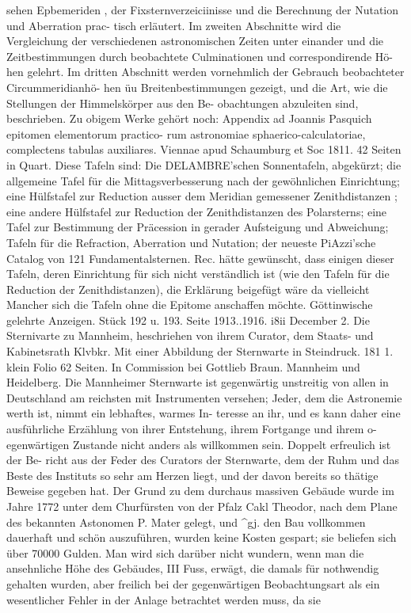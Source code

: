 \documentclass[12pt,a4paper]{article}
\begin{document}
sehen  Epbemeriden ,  der  Fixsternverzeiciinisse  und  die  Berechnung  der  Nutation  und  Aberration  prac- tisch  erläutert.  Im  zweiten  Abschnitte  wird  die  Vergleichung  der  verschiedenen  astronomischen  Zeiten unter  einander  und  die  Zeitbestimmungen  durch  beobachtete  Culminationen  und  correspondirende  Hö- hen gelehrt.  Im  dritten  Abschnitt  werden  vornehmlich  der  Gebrauch  beobachteter  Circummeridianhö- hen  üu  Breitenbestimmungen  gezeigt,  und  die  Art,  wie  die  Stellungen  der  Himmelskörper  aus  den  Be- obachtungen abzuleiten  sind,  beschrieben. Zu  obigem  Werke  gehört  noch:  Appendix  ad  Joannis  Pasquich  epitomen  elementorum  practico- rum  astronomiae  sphaerico-calculatoriae,  complectens  tabulas  auxiliares.  Viennae  apud  Schaumburg  et Soc  1811.  42  Seiten  in  Quart.  Diese  Tafeln  sind:  Die  DELAMBRE'schen  Sonnentafeln,  abgekürzt;  die allgemeine  Tafel  für  die  Mittagsverbesserung  nach  der  gewöhnlichen  Einrichtung;  eine  Hülfstafel  zur Reduction  ausser  dem  Meridian  gemessener  Zenithdistanzen ;  eine  andere  Hülfstafel  zur  Reduction  der Zenithdistanzen  des  Polarsterns;  eine  Tafel  zur  Bestimmung  der  Präcession  in  gerader  Aufsteigung  und Abweichung;  Tafeln  für  die  Refraction,  Aberration  und  Nutation;  der  neueste  PiAzzi'sche  Catalog  von 121  Fundamentalsternen.  Rec.  hätte  gewünscht,  dass  einigen  dieser  Tafeln,  deren  Einrichtung  für  sich nicht  verständlich  ist  (wie  den  Tafeln  für  die  Reduction  der  Zenithdistanzen),  die  Erklärung  beigefügt wäre    da  vielleicht  Mancher  sich  die  Tafeln  ohne  die  Epitome  anschaffen  möchte. Göttinwische  gelehrte  Anzeigen.  Stück  192  u.  193.  Seite  1913..1916.  i8ii  December  2. Die  Sternivarte  zu  Mannheim,  heschriehen  von  ihrem  Curator,  dem  Staats-  und  Kabinetsrath  Klvbkr. Mit  einer  Abbildung  der  Sternwarte  in  Steindruck.  181 1.  klein  Folio  62  Seiten.  In  Commission  bei Gottlieb  Braun.     Mannheim  und  Heidelberg. Die  Mannheimer  Sternwarte  ist  gegenwärtig  unstreitig  von  allen  in  Deutschland  am  reichsten mit  Instrumenten  versehen;  Jeder,  dem  die  Astronemie  werth  ist,  nimmt  ein  lebhaftes,  warmes  In- teresse an  ihr,  und  es  kann  daher  eine  ausführliche  Erzählung  von  ihrer  Entstehung,  ihrem  Fortgange und  ihrem  o-egenwärtigen  Zustande  nicht  anders  als  willkommen  sein.  Doppelt  erfreulich  ist  der  Be- richt aus  der  Feder  des  Curators  der  Sternwarte,  dem  der  Ruhm  und  das  Beste  des  Instituts  so  sehr am  Herzen  liegt,  und  der  davon  bereits  so  thätige  Beweise  gegeben  hat. Der  Grund  zu  dem  durchaus  massiven  Gebäude  wurde  im  Jahre  1772  unter  dem  Churfürsten  von der  Pfalz  Cakl  Theodor,  nach  dem  Plane  des  bekannten  Astonomen  P.  Mater  gelegt,  und \textasciicircum{}gj.  den  Bau vollkommen  dauerhaft  und  schön  auszuführen,  wurden  keine  Kosten  gespart;  sie  beliefen  sich  über 70000  Gulden.  Man  wird  sich  darüber  nicht  wundern,  wenn  man  die  ansehnliche  Höhe  des  Gebäudes, III  Fuss,  erwägt,  die  damals  für  nothwendig  gehalten  wurden,  aber  freilich  bei  der  gegenwärtigen Beobachtungsart  als  ein  wesentlicher  Fehler  in  der  Anlage  betrachtet  werden  muss,  da  sie 
\end{document}

